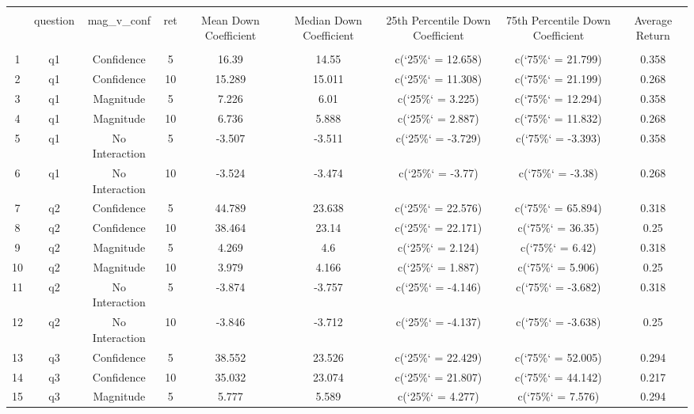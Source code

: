 
\begin{table}[!htbp] \centering 
  \caption{} 
  \label{} 
\begin{tabular}{@{\extracolsep{5pt}} ccccccccc} 
\\[-1.8ex]\hline 
\hline \\[-1.8ex] 
 & question & mag\_v\_conf & ret & Mean Down Coefficient & Median Down Coefficient & 25th Percentile Down Coefficient & 75th Percentile Down Coefficient & Average Return \\ 
\hline \\[-1.8ex] 
1 & q1 & Confidence & 5 & 16.39 & 14.55 & c(`25\%` = 12.658) & c(`75\%` = 21.799) & 0.358 \\ 
2 & q1 & Confidence & 10 & 15.289 & 15.011 & c(`25\%` = 11.308) & c(`75\%` = 21.199) & 0.268 \\ 
3 & q1 & Magnitude & 5 & 7.226 & 6.01 & c(`25\%` = 3.225) & c(`75\%` = 12.294) & 0.358 \\ 
4 & q1 & Magnitude & 10 & 6.736 & 5.888 & c(`25\%` = 2.887) & c(`75\%` = 11.832) & 0.268 \\ 
5 & q1 & No Interaction & 5 & -3.507 & -3.511 & c(`25\%` = -3.729) & c(`75\%` = -3.393) & 0.358 \\ 
6 & q1 & No Interaction & 10 & -3.524 & -3.474 & c(`25\%` = -3.77) & c(`75\%` = -3.38) & 0.268 \\ 
7 & q2 & Confidence & 5 & 44.789 & 23.638 & c(`25\%` = 22.576) & c(`75\%` = 65.894) & 0.318 \\ 
8 & q2 & Confidence & 10 & 38.464 & 23.14 & c(`25\%` = 22.171) & c(`75\%` = 36.35) & 0.25 \\ 
9 & q2 & Magnitude & 5 & 4.269 & 4.6 & c(`25\%` = 2.124) & c(`75\%` = 6.42) & 0.318 \\ 
10 & q2 & Magnitude & 10 & 3.979 & 4.166 & c(`25\%` = 1.887) & c(`75\%` = 5.906) & 0.25 \\ 
11 & q2 & No Interaction & 5 & -3.874 & -3.757 & c(`25\%` = -4.146) & c(`75\%` = -3.682) & 0.318 \\ 
12 & q2 & No Interaction & 10 & -3.846 & -3.712 & c(`25\%` = -4.137) & c(`75\%` = -3.638) & 0.25 \\ 
13 & q3 & Confidence & 5 & 38.552 & 23.526 & c(`25\%` = 22.429) & c(`75\%` = 52.005) & 0.294 \\ 
14 & q3 & Confidence & 10 & 35.032 & 23.074 & c(`25\%` = 21.807) & c(`75\%` = 44.142) & 0.217 \\ 
15 & q3 & Magnitude & 5 & 5.777 & 5.589 & c(`25\%` = 4.277) & c(`75\%` = 7.576) & 0.294 \\ 

\end{tabular}
\end{table}

